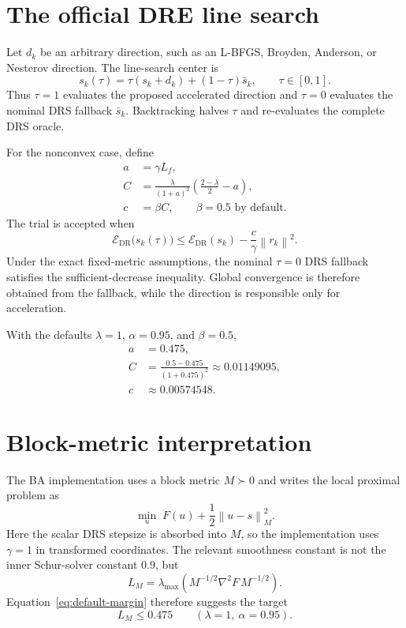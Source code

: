 \documentclass[11pt]{article}
\newcommand{\Edr}{\mathcal{E}_{\mathrm{DR}}}
\newcommand{\norm}[1]{\left\lVert #1\right\rVert}
\begin{document}
\section{The official DRE line search}

Let $d_k$ be an arbitrary direction, such as an L-BFGS, Broyden, Anderson, or
Nesterov direction. The line-search center is
\begin{equation}
  s_k(\tau)
  =\tau(s_k+d_k)+(1-\tau)\bar s_k,
  \qquad \tau\in[0,1].
  \label{eq:tau-interpolation}
\end{equation}
Thus $\tau=1$ evaluates the proposed accelerated direction and $\tau=0$
evaluates the nominal DRS fallback $\bar s_k$. Backtracking halves $\tau$ and
re-evaluates the complete DRS oracle.

For the nonconvex case, define
\begin{align}
  a &= \gamma L_f, \\
  C &= \frac{\lambda}{(1+a)^2}
       \left(\frac{2-\lambda}{2}-a\right), \\
  c &= \beta C,
  \qquad \beta=0.5 \text{ by default}.
  \label{eq:decrease-constant}
\end{align}
The trial is accepted when
\begin{equation}
  \Edr\bigl(s_k(\tau)\bigr)
  \le
  \Edr(s_k)-\frac{c}{\gamma}\norm{r_k}^2.
  \label{eq:drls-acceptance}
\end{equation}
Under the exact fixed-metric assumptions, the nominal $\tau=0$ DRS fallback
satisfies the sufficient-decrease inequality. Global convergence is therefore
obtained from the fallback, while the direction is responsible only for
acceleration.

With the defaults $\lambda=1$, $\alpha=0.95$, and $\beta=0.5$,
\begin{align}
  a &= 0.475, \\
  C &= \frac{0.5-0.475}{(1+0.475)^2}
     \approx 0.01149095, \\
  c &\approx 0.00574548.
\end{align}

\section{Block-metric interpretation}

The BA implementation uses a block metric $M\succ0$ and writes the local
proximal problem as
\begin{equation}
  \min_u\;F(u)+\frac{1}{2}\norm{u-s}_M^2.
  \label{eq:block-prox}
\end{equation}
Here the scalar DRS stepsize is absorbed into $M$, so the implementation uses
$\gamma=1$ in transformed coordinates. The relevant smoothness constant is
not the inner Schur-solver constant $0.9$, but
\begin{equation}
  L_M
  =\lambda_{\max}\left(
    M^{-1/2}\nabla^2F\,M^{-1/2}
  \right).
  \label{eq:transformed-lipschitz}
\end{equation}
Equation~\eqref{eq:default-margin} therefore suggests the target
\begin{equation}
  L_M\le0.475
  \qquad (\lambda=1,\ \alpha=0.95).
  \label{eq:metric-target}
\end{equation}
\end{document}
